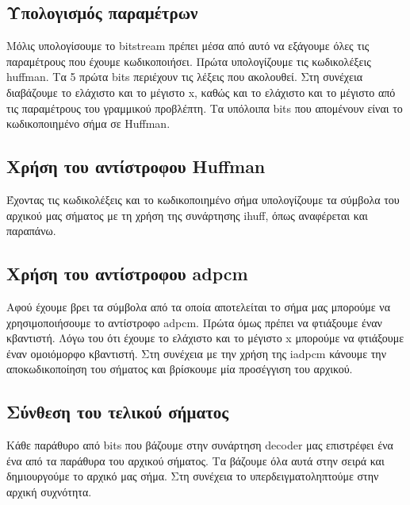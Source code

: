 \subsection{Υπολογισμός παραμέτρων}
\par Μόλις υπολογίσουμε το bitstream πρέπει μέσα από αυτό να εξάγουμε όλες τις 
παραμέτρους που έχουμε κωδικοποιήσει. Πρώτα υπολογίζουμε τις κωδικολέξεις huffman.
Τα 5 πρώτα bits περιέχουν τις λέξεις που ακολουθεί. Στη συνέχεια διαβάζουμε το 
ελάχιστο και το μέγιστο x, καθώς και το ελάχιστο και το μέγιστο από τις παραμέτρους 
του γραμμικού προβλέπτη. Τα υπόλοιπα bits που απομένουν είναι το κωδικοποιημένο 
σήμα σε Huffman.

\subsection{Χρήση του αντίστροφου Huffman}
\par Έχοντας τις κωδικολέξεις και το κωδικοποιημένο σήμα υπολογίζουμε τα σύμβολα 
του αρχικού μας σήματος με τη χρήση της συνάρτησης ihuff, όπως αναφέρεται και 
παραπάνω.

\subsection{Χρήση του αντίστροφου adpcm}
\par Αφού έχουμε βρει τα σύμβολα από τα οποία αποτελείται το σήμα μας μπορούμε να 
χρησιμοποιήσουμε το αντίστροφο adpcm. Πρώτα όμως πρέπει να φτιάξουμε έναν κβαντιστή. 
Λόγω του ότι έχουμε το ελάχιστο και το μέγιστο x μπορούμε να φτιάξουμε έναν ομοιόμορφο 
κβαντιστή. Στη συνέχεια με την χρήση της iadpcm κάνουμε την αποκωδικοποίηση του σήματος 
και βρίσκουμε μία προσέγγιση του αρχικού.

\subsection{Σύνθεση του τελικού σήματος}
\par Κάθε παράθυρο από bits που βάζουμε στην συνάρτηση decoder μας επιστρέφει ένα 
ένα από τα παράθυρα του αρχικού σήματος. Τα βάζουμε όλα αυτά στην σειρά και δημιουργούμε 
το αρχικό μας σήμα. Στη συνέχεια το υπερδειγματοληπτούμε στην αρχική συχνότητα.

